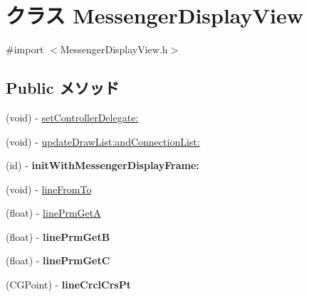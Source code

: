 \hypertarget{interface_messenger_display_view}{
\section{クラス MessengerDisplayView}
\label{d8/d39/interface_messenger_display_view}
}


{\ttfamily \#import $<$MessengerDisplayView.h$>$}

\subsection*{Public メソッド}
\begin{DoxyCompactItemize}
\item 
(void) -\/ \hyperlink{interface_messenger_display_view_ac1aa749dc5f3e7430d8d72841224c919}{setControllerDelegate:}
\item 
(void) -\/ \hyperlink{interface_messenger_display_view_a3790ae1de28d367eb7ec15ec8ed545fb}{updateDrawList:andConnectionList:}
\item 
\hypertarget{interface_messenger_display_view_a35cd00c1a534e3f94111e8ba45bd9cc6}{
(id) -\/ {\bfseries initWithMessengerDisplayFrame:}}
\label{d8/d39/interface_messenger_display_view_a35cd00c1a534e3f94111e8ba45bd9cc6}

\item 
(void) -\/ \hyperlink{interface_messenger_display_view_ad4866b13411e41cdb68d3c92053277eb}{lineFromTo}
\item 
(float) -\/ \hyperlink{interface_messenger_display_view_ac1379b56ac2e7d2b572e147e81971e90}{linePrmGetA}
\item 
\hypertarget{interface_messenger_display_view_a71965f56d6a2665d3f71b0c4ecfe13d0}{
(float) -\/ {\bfseries linePrmGetB}}
\label{d8/d39/interface_messenger_display_view_a71965f56d6a2665d3f71b0c4ecfe13d0}

\item 
\hypertarget{interface_messenger_display_view_ad3b01c0e203aaec5c631091448026ad8}{
(float) -\/ {\bfseries linePrmGetC}}
\label{d8/d39/interface_messenger_display_view_ad3b01c0e203aaec5c631091448026ad8}

\item 
\hypertarget{interface_messenger_display_view_a85472d3e727eb4b6a41ad9f71b83f4f7}{
(CGPoint) -\/ {\bfseries lineCrclCrsPt}}
\label{d8/d39/interface_messenger_display_view_a85472d3e727eb4b6a41ad9f71b83f4f7}

\end{DoxyCompactItemize}
